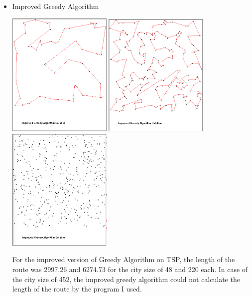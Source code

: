 \documentclass[12pt]{article}
\begin{document}
\begin{itemize}
\item Improved Greedy Algorithm
		\begin{center}
			\includegraphics[width=5cm]{ImprovedGreedy48.PNG}
            \includegraphics[width=5cm]{ImprovedGreedy220.PNG}
            \includegraphics[width=5cm]{ImprovedGreedy452.png}
		\end{center}

For the improved version of Greedy Algorithm on TSP, the length of the route was 2997.26 and 6274.73 for the city size of 48 and 220 each. In case of the city size of 452, the improved greedy algorithm could not calculate the length of the route by the program I used. 


\end{itemize}
\end{document}
